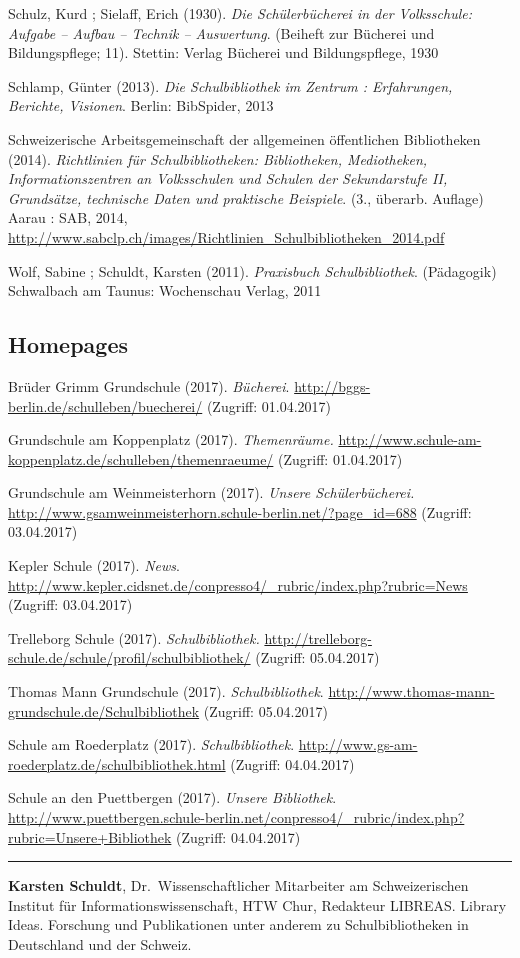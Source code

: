\documentclass[a4paper,
fontsize=11pt,
oneside,
numbers=noperiodatend,
parskip=half-,
bibliography=totoc,
final
]{scrartcl}
\begin{document}
Schulz, Kurd ; Sielaff, Erich (1930). \emph{Die Schülerbücherei in der
Volksschule: Aufgabe -- Aufbau -- Technik -- Auswertung}. (Beiheft zur
Bücherei und Bildungspflege; 11). Stettin: Verlag Bücherei und
Bildungspflege, 1930

Schlamp, Günter (2013). \emph{Die Schulbibliothek im Zentrum :
Erfahrungen, Berichte, Visionen}. Berlin: BibSpider, 2013

Schweizerische Arbeitsgemeinschaft der allgemeinen öffentlichen
Bibliotheken (2014). \emph{Richtlinien für Schulbibliotheken:
Bibliotheken, Mediotheken, Informationszentren an Volksschulen und
Schulen der Sekundarstufe II, Grundsätze, technische Daten und
praktische Beispiele}. (3., überarb. Auflage) Aarau : SAB, 2014,
\url{http://www.sabclp.ch/images/Richtlinien_Schulbibliotheken_2014.pdf}

Wolf, Sabine ; Schuldt, Karsten (2011). \emph{Praxisbuch
Schulbibliothek}. (Pädagogik) Schwalbach am Taunus: Wochenschau Verlag,
2011

\subsection{Homepages}\label{homepages}

Brüder Grimm Grundschule (2017). \emph{Bücherei}.
\url{http://bggs-berlin.de/schulleben/buecherei/} (Zugriff: 01.04.2017)

Grundschule am Koppenplatz (2017). \emph{Themenräume.}
\url{http://www.schule-am-koppenplatz.de/schulleben/themenraeume/}
(Zugriff: 01.04.2017)

Grundschule am Weinmeisterhorn (2017). \emph{Unsere Schülerbücherei.}
\url{http://www.gsamweinmeisterhorn.schule-berlin.net/?page_id=688}
(Zugriff: 03.04.2017)

Kepler Schule (2017). \emph{News}.
\url{http://www.kepler.cidsnet.de/conpresso4/_rubric/index.php?rubric=News}
(Zugriff: 03.04.2017)

Trelleborg Schule (2017). \emph{Schulbibliothek.}
\url{http://trelleborg-schule.de/schule/profil/schulbibliothek/}
(Zugriff: 05.04.2017)

Thomas Mann Grundschule (2017). \emph{Schulbibliothek}.
\url{http://www.thomas-mann-grundschule.de/Schulbibliothek} (Zugriff:
05.04.2017)

Schule am Roederplatz (2017). \emph{Schulbibliothek}.
\url{http://www.gs-am-roederplatz.de/schulbibliothek.html} (Zugriff:
04.04.2017)

Schule an den Puettbergen (2017). \emph{Unsere Bibliothek}.
\url{http://www.puettbergen.schule-berlin.net/conpresso4/_rubric/index.php?rubric=Unsere+Bibliothek}
(Zugriff: 04.04.2017)

\begin{center}\rule{0.5\linewidth}{\linethickness}\end{center}

\textbf{Karsten Schuldt}, Dr.~Wissenschaftlicher Mitarbeiter am
Schweizerischen Institut für Informationswissenschaft, HTW Chur,
Redakteur LIBREAS. Library Ideas. Forschung und Publikationen unter
anderem zu Schulbibliotheken in Deutschland und der Schweiz.
\end{document}
